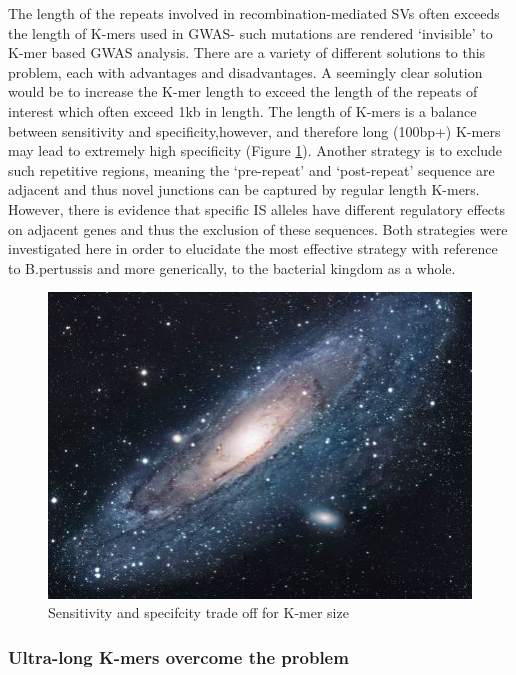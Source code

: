 \documentclass{article}
\begin{document}
The length of the repeats involved in recombination-mediated SVs often exceeds the length of K-mers used in GWAS- such mutations are rendered `invisible' to K-mer based GWAS analysis. There are a variety of different solutions to this problem, each with advantages and disadvantages. A seemingly clear solution would be to increase the K-mer length to exceed the length of the repeats of interest which often exceed 1kb in length. The length of K-mers is a balance between sensitivity and specificity,however, and therefore  long (100bp+) K-mers may lead to extremely high specificity (Figure \ref{fig:Sens_spec}). Another strategy is to exclude such repetitive regions, meaning the `pre-repeat' and `post-repeat' sequence are adjacent and thus novel junctions can be captured by regular length K-mers. However, there is evidence that specific IS alleles have different regulatory effects on adjacent genes and thus the exclusion of these sequences. Both strategies were investigated here in order to elucidate the most effective strategy with reference to B.pertussis and more generically, to the bacterial kingdom as a whole.



\begin{figure}[h!]
\centering
\includegraphics[scale=1.7]{universe}
\caption{Sensitivity and specifcity trade off for K-mer size}
\label{fig:Sens_spec}
\end{figure}


\subsubsection{Ultra-long K-mers overcome the problem}

\end{document}
